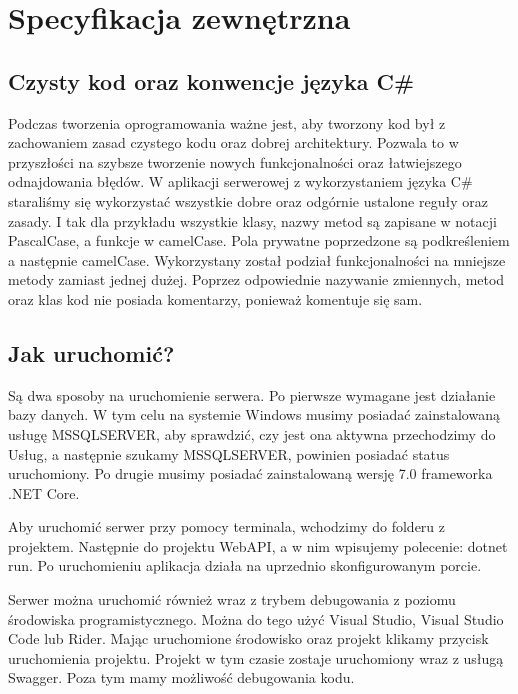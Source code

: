 \documentclass[a4paper,twoside,12pt]{book}
\begin{document}
\section{Specyfikacja zewnętrzna}
\subsection{Czysty kod oraz konwencje języka C\# }
Podczas tworzenia oprogramowania ważne jest, aby tworzony kod był z zachowaniem zasad czystego kodu oraz dobrej architektury. Pozwala to w przyszłości na szybsze tworzenie nowych funkcjonalności oraz łatwiejszego odnajdowania błędów. W aplikacji serwerowej z wykorzystaniem języka C\# staraliśmy się wykorzystać wszystkie dobre oraz odgórnie ustalone reguły oraz zasady. I tak dla przykładu wszystkie klasy, nazwy metod są zapisane w notacji PascalCase, a funkcje w camelCase. Pola prywatne poprzedzone są podkreśleniem a następnie camelCase. Wykorzystany został podział funkcjonalności na mniejsze metody zamiast jednej dużej. Poprzez odpowiednie nazywanie zmiennych, metod oraz klas kod nie posiada komentarzy, ponieważ komentuje się sam. 

\subsection{Jak uruchomić?}
Są dwa sposoby na uruchomienie serwera. Po pierwsze wymagane jest działanie bazy danych. W tym celu na systemie Windows musimy posiadać zainstalowaną usługę MSSQLSERVER, aby sprawdzić, czy jest ona aktywna przechodzimy do Usług, a następnie szukamy MSSQLSERVER, powinien posiadać status uruchomiony. Po drugie musimy posiadać zainstalowaną wersję 7.0 frameworka .NET Core.  

Aby uruchomić serwer przy pomocy terminala, wchodzimy do folderu z projektem. Następnie do projektu WebAPI, a w nim wpisujemy polecenie: dotnet run. Po uruchomieniu aplikacja działa na uprzednio skonfigurowanym porcie. 

Serwer można uruchomić również wraz z trybem debugowania z poziomu środowiska programistycznego. Można do tego użyć Visual Studio, Visual Studio Code lub Rider. Mając uruchomione środowisko oraz projekt klikamy przycisk uruchomienia projektu. Projekt w tym czasie zostaje uruchomiony wraz z usługą Swagger. Poza tym mamy możliwość debugowania kodu. 
\end{document}
